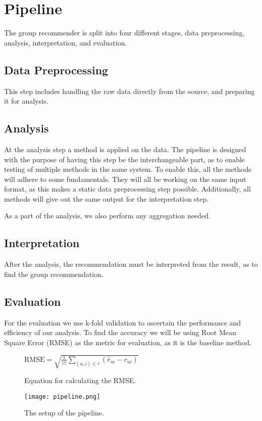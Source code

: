 \section{Pipeline}	\label{st:pipeline}
The group recommender is split into four different stages, data preprocessing, analysis, interpretation, and evaluation.

\subsection{Data Preprocessing}
This step includes handling the raw data directly from the source, and preparing it for analysis.
\subsection{Analysis}
At the analysis step a method is applied on the data. The pipeline is designed with the purpose of having this step be the interchangeable part, as to enable testing of multiple methods in the same system. To enable this, all the methods will adhere to some fundamentals. They will all be working on the same input format, as this makes a static data preprocessing step possible. Additionally, all methods will give out the same output for the interpretation step.

As a part of the analysis, we also perform any aggregation needed.
\subsection{Interpretation}
After the analysis, the recommendation must be interpreted from the result, as to find the group recommendation.
\subsection{Evaluation}
For the evaluation we use k-fold validation to ascertain the performance and efficiency of our analysis.
To find the accuracy we will be using Root Mean Square Error (RMSE) as the metric for evaluation, as it is the baseline method.

\begin{figure}
	\centering
	$\text{RMSE} = \sqrt{\frac{1}{|\tau|}\sum_{(u,i)\in \tau}(\hat{r}_{ui}-r_{ui})}$
	\caption{Equation for calculating the RMSE. \label{equa:setup_rmse}}
\end{figure}

\begin{figure}
	\centering
	\texttt{[image: pipeline.png]}
	\caption{The setup of the pipeline. \label{fig:setup_pipeline}}
\end{figure}